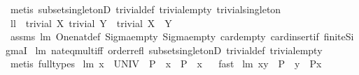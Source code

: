 \begin{isabellebody}
%
\isadelimproof
%
\endisadelimproof
%
\isatagproof
{}\isamarkupfalse%
\ {\isacharparenleft}metis\ subset{\isacharunderscore}singletonD\ trivial{\isacharunderscore}def\ trivial{\isacharunderscore}empty\ trivial{\isacharunderscore}singleton{\isacharparenright}%
\endisatagproof
{\isafoldproof}%
%
\isadelimproof
\isanewline
%
\endisadelimproof
\isanewline
{}\isamarkupfalse%
\ ll{}{}{\isacharcolon}\ \ {\isachardoublequoteopen}trivial\ X{\isachardoublequoteclose}\ {\isachardoublequoteopen}trivial\ Y{\isachardoublequoteclose}\ \ {\isachardoublequoteopen}trivial\ {\isacharparenleft}X\ {\isasymtimes}\ Y{\isacharparenright}{\isachardoublequoteclose}\isanewline
%
\isadelimproof
%
\endisadelimproof
%
\isatagproof
{}\isamarkupfalse%
\ assms\ lm{}{}{}\ One{\isacharunderscore}nat{\isacharunderscore}def\ Sigma{\isacharunderscore}empty{}\ Sigma{\isacharunderscore}empty{}\ card{\isacharunderscore}empty\ card{\isacharunderscore}insert{\isacharunderscore}if\ finite{\isacharunderscore}SigmaI\ \isanewline
lm{}{}\ nat{\isacharunderscore}{}{\isacharunderscore}eq{\isacharunderscore}mult{\isacharunderscore}iff\ order{\isacharunderscore}refl\ subset{\isacharunderscore}singletonD\ trivial{\isacharunderscore}def\ trivial{\isacharunderscore}empty\isanewline
{}\isamarkupfalse%
\ {\isacharparenleft}metis\ {\isacharparenleft}full{\isacharunderscore}types{\isacharparenright}{\isacharparenright}%
\endisatagproof
{\isafoldproof}%
%
\isadelimproof
\isanewline
%
\endisadelimproof
\isanewline
{}\isamarkupfalse%
\ lm{}{}{}{\isacharcolon}\ {\isachardoublequoteopen}{\isacharparenleft}{\isacharbraceleft}x{\isacharbraceright}\ {\isasymtimes}\ UNIV{\isacharparenright}\ {\isasyminter}\ P\ {\isacharequal}\ {\isacharbraceleft}x{\isacharbraceright}\ {\isasymtimes}\ {\isacharparenleft}P\ {\isacharbackquote}{\isacharbackquote}\ {\isacharbraceleft}x{\isacharbraceright}{\isacharparenright}{\isachardoublequoteclose}%
\isadelimproof
\ %
\endisadelimproof
%
\isatagproof
{}\isamarkupfalse%
\ fast%
\endisatagproof
{\isafoldproof}%
%
\isadelimproof
%
\endisadelimproof
\isanewline
\isanewline
{}\isamarkupfalse%
\ lm{}{}{\isacharcolon}\ {\isachardoublequoteopen}{\isacharparenleft}x{\isacharcomma}y{\isacharparenright}\ {\isasymin}\ P\ {\isacharequal}\ {\isacharparenleft}y\ {\isasymin}\ P{\isacharbackquote}{\isacharbackquote}{\isacharbraceleft}x{\isacharbraceright}{\isacharparenright}{\isachardoublequoteclose}%

\end{isabellebody}
